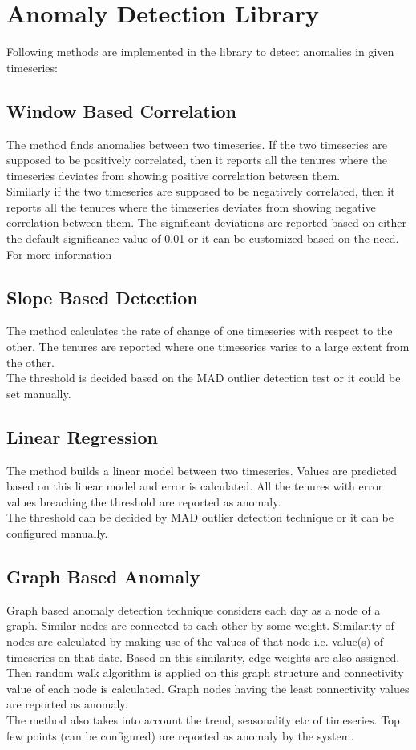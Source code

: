 \section{Anomaly Detection Library}
Following methods are implemented in the library to detect anomalies in given timeseries:
\subsection{Window Based Correlation}
The method finds anomalies between two timeseries. If the two timeseries are supposed to be positively correlated, then it reports all the tenures where the timeseries deviates from showing positive correlation between them.
\\
Similarly if the two timeseries are supposed to be negatively correlated, then it reports all the tenures where the timeseries deviates from showing negative correlation between them. The significant deviations are reported based on either the default significance value of 0.01 or it can be customized based on the need. For more information 
\subsection{Slope Based Detection}
The  method calculates the rate of change of one timeseries with respect to the other. The tenures are reported where one timeseries varies to a large extent from the other.
\\
The threshold is decided based on the MAD outlier detection test or it could be set manually.
\subsection{Linear Regression}
The method builds a linear model between two timeseries. Values are predicted based on this linear model and error is calculated. All the tenures with error values breaching the threshold are reported as anomaly. 
\\
The threshold can be decided by MAD outlier detection technique or it can be configured manually.
\subsection{Graph Based Anomaly}
Graph based anomaly detection technique considers each day as a node of a graph. Similar nodes are connected to each other by some weight. Similarity of nodes are calculated by making use of the values of that node i.e. value(s) of timeseries on that date. Based on this similarity, edge weights are also assigned. Then random walk algorithm is applied on this graph structure and connectivity value of each node is calculated. Graph nodes having the least connectivity values are reported as anomaly.
\\
The method also takes into account the trend, seasonality etc of timeseries. Top few points (can be configured) are reported as anomaly by the system.
